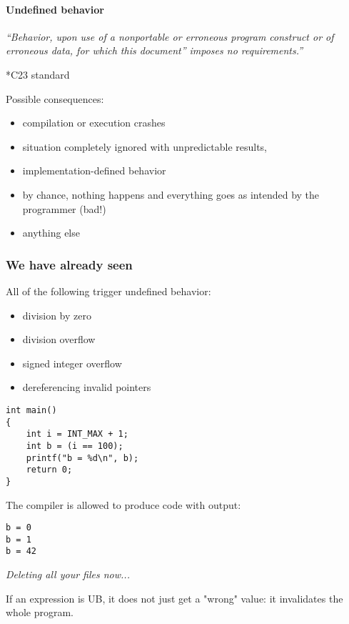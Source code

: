 \documentclass[12pt]{article}
\begin{document}
\paragraph{Undefined behavior}

\textit{``Behavior, upon use of a nonportable or erroneous program construct or of erroneous data, for which this document'' imposes no requirements.''}

\begin{flushright}
\tiny{*C23 standard}
\end{flushright}

Possible consequences:
\begin{itemize}
  \item compilation or execution crashes
  \item situation completely ignored with unpredictable results,
  \item implementation-defined behavior
  \item by chance, nothing happens and everything goes as intended by the programmer (bad!)
  \item anything else
\end{itemize}

\subsubsection{We have already seen}

All of the following trigger undefined behavior:
\begin{itemize}
  \item division by zero
  \item division overflow
  \item signed integer overflow
  \item dereferencing invalid pointers
\end{itemize}

\begin{lstlisting}
int main()
{
    int i = INT_MAX + 1;
    int b = (i == 100);
    printf("b = %d\n", b);
    return 0;
}
\end{lstlisting}

The compiler is allowed to produce code with output:

\begin{lstlisting}
b = 0
b = 1
b = 42
\end{lstlisting}

\textit{Deleting all your files now...}

If an expression is UB, it does not just get a "wrong" value: it invalidates the whole program.
\end{document}
